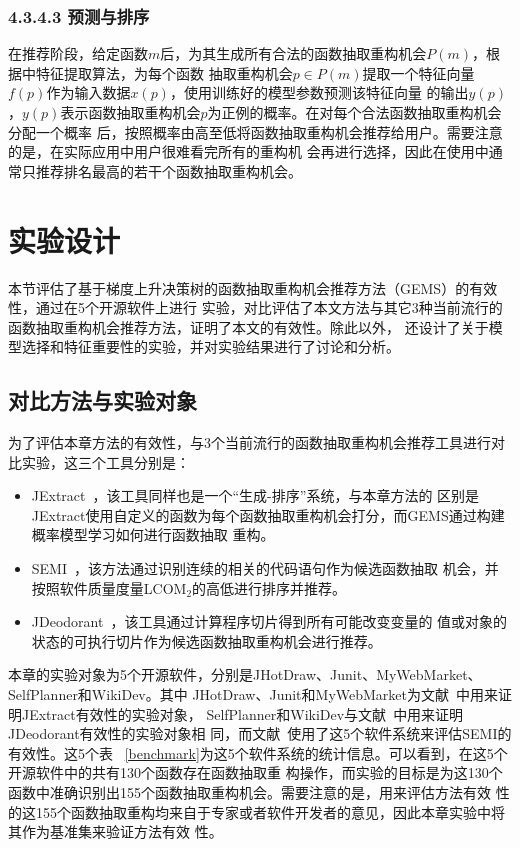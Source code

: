\subsubsection{4.3.4.3 预测与排序}
在推荐阶段，给定函数$m$后，为其生成所有合法的函数抽取重构机会$P(m)$，根据中特征提取算法，为每个函数
抽取重构机会$p\in P(m)$提取一个特征向量$f(p)$作为输入数据$x(p)$，使用训练好的模型参数预测该特征向量
的输出$y(p)$，$y(p)$表示函数抽取重构机会$p$为正例的概率。在对每个合法函数抽取重构机会分配一个概率
后，按照概率由高至低将函数抽取重构机会推荐给用户。需要注意的是，在实际应用中用户很难看完所有的重构机
会再进行选择，因此在使用中通常只推荐排名最高的若干个函数抽取重构机会。

\section{实验设计}
本节评估了基于梯度上升决策树的函数抽取重构机会推荐方法（GEMS）的有效性，通过在5个开源软件上进行
实验，对比评估了本文方法与其它3种当前流行的函数抽取重构机会推荐方法，证明了本文的有效性。除此以外，
还设计了关于模型选择和特征重要性的实验，并对实验结果进行了讨论和分析。

\subsection{对比方法与实验对象}
为了评估本章方法的有效性，与3个当前流行的函数抽取重构机会推荐工具进行对比实验，这三个工具分别是：
\begin{itemize}
  \item JExtract~\cite{silva:ICPC14,silva:CoRR15}，该工具同样也是一个``生成-排序''系统，与本章方法的
区别是JExtract使用自定义的函数为每个函数抽取重构机会打分，而GEMS通过构建概率模型学习如何进行函数抽取
重构。
  \item SEMI~\cite{charalampidou2016identifying}，该方法通过识别连续的相关的代码语句作为候选函数抽取
机会，并按照软件质量度量LCOM$_2$的高低进行排序并推荐。
  \item JDeodorant~\cite{tsantalis2011identification}，该工具通过计算程序切片得到所有可能改变变量的
  值或对象的状态的可执行切片作为候选函数抽取重构机会进行推荐。
\end{itemize}

本章的实验对象为5个开源软件，分别是JHotDraw、Junit、MyWebMarket、SelfPlanner和WikiDev。其中
JHotDraw、Junit和MyWebMarket为文献~\cite{silva:ICPC14}中用来证明JExtract有效性的实验对象，
SelfPlanner和WikiDev与文献~\cite{tsantalis2011identification}中用来证明JDeodorant有效性的实验对象相
同，而文献~\cite{charalampidou2016identifying}使用了这5个软件系统来评估SEMI的有效性。这5个表
~\ref{benchmark}为这5个软件系统的统计信息。可以看到，在这5个开源软件中的共有130个函数存在函数抽取重
构操作，而实验的目标是为这130个函数中准确识别出155个函数抽取重构机会。需要注意的是，用来评估方法有效
性的这155个函数抽取重构均来自于专家或者软件开发者的意见，因此本章实验中将其作为基准集来验证方法有效
性。


